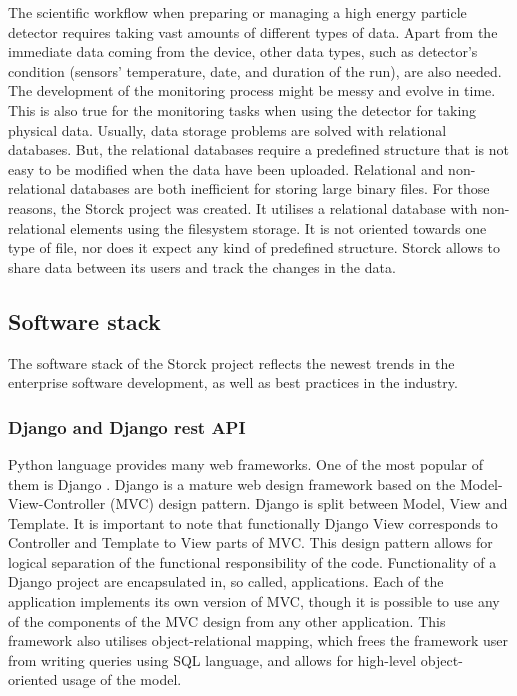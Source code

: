 The scientific workflow when preparing or managing a high energy particle detector requires taking vast amounts of different types of data.
Apart from the immediate data coming from the device, other data types, such as detector's condition (sensors' temperature, date, and duration of the run), are also needed.
The development of the monitoring process might be messy and evolve in time.
This is also true for the monitoring tasks when using the detector for taking physical data.
Usually, data storage problems are solved with relational databases.
But, the relational databases require a predefined structure that is not easy to be modified when the data have been uploaded.
Relational and non-relational databases are both inefficient for storing large binary files.
For those reasons, the Storck project was created.
It utilises a relational database with non-relational elements using the filesystem storage.
It is not oriented towards one type of file, nor does it expect any kind of predefined structure.
Storck allows to share data between its users and track the changes in the data.


\subsection{Software stack}

The software stack of the Storck project reflects the newest trends in the enterprise software development, as well as best practices in the industry.

\subsubsection{Django and Django rest API}
Python language provides many web frameworks.
One of the most popular of them is Django \cite{django}. 
Django is a mature web design framework based on the Model-View-Controller (MVC) design pattern.
Django is split between Model, View and Template.
It is important to note that functionally Django View corresponds to Controller and Template to View parts of MVC.
This design pattern allows for logical separation of the functional responsibility of the code.
Functionality of a Django project are encapsulated in, so called, applications.
Each of the application implements its own version of MVC, though it is possible to use any of the components of the MVC design from any other application.
This framework also utilises object-relational mapping, which frees the framework user from writing queries using SQL language, and allows for high-level object-oriented usage of the model.

